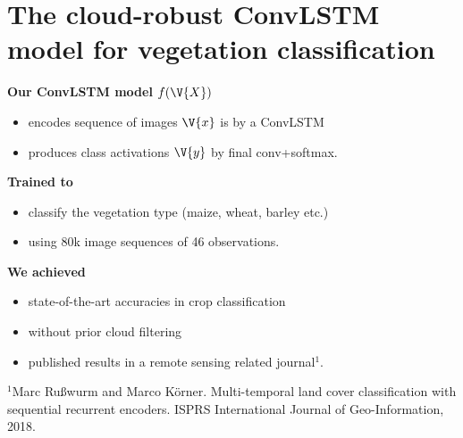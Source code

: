 \documentclass[a0]{tumposter}
\newcommand{\pre}[1]{
	{\color{focusone}\textbf{#1}}
}
\begin{document}
\section{The cloud-robust ConvLSTM model for vegetation classification}

\begin{minipage}{0.49\linewidth}
	
	\figseqencnetwork
\end{minipage}
\hspace{1em}
\begin{minipage}{0.49\linewidth}
	
\vspace{.5em}
\textbf{Our ConvLSTM model} $f(\V{X})$
\begin{itemize}
	\item encodes sequence of images $\V{x}$ is by a ConvLSTM
	\item produces class activations $\V{y}$ by final conv+softmax.
\end{itemize}
 
\vspace{1em}
\textbf{Trained to }
\begin{itemize}
	\item classify the vegetation type (maize, wheat, barley etc.)
	\item using 80k image sequences of 46 observations.
	
\end{itemize}
\vspace{1em}

\textbf{We achieved}
\begin{itemize}
	\item state-of-the-art accuracies in crop classification
	\item without prior cloud filtering
	\item published results in a remote sensing related journal$^1$.
\end{itemize}

\end{minipage}

\vspace{1em}
{\small $^1$Marc Rußwurm and Marco Körner. Multi-temporal land cover classification with sequential recurrent
	encoders. ISPRS International Journal of Geo-Information, 2018.}
%	
\end{document}
